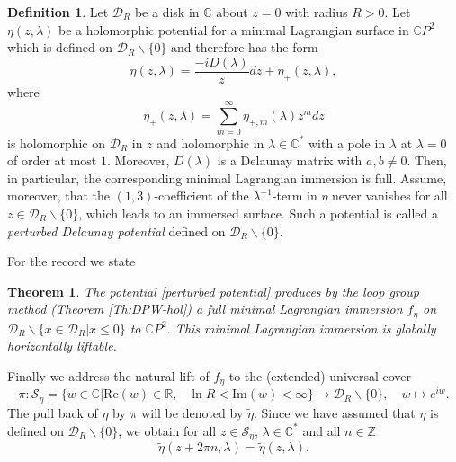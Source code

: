 \documentclass[a4paper,11pt]{amsart}
\newtheorem{theorem}{Theorem}[section]
\theoremstyle{definition}
\newtheorem{definition}{Definition}
\numberwithin{equation}{section}
\newcommand{\C}{\mathbb{C}}
\begin{document}
\begin{definition}
Let $\mathcal{D}_R$ be  a disk in $\mathbb{C}$ about $z=0$ with radius $R>0$.
Let $\eta(z,\lambda)$ be a holomorphic potential for a minimal Lagrangian surface 
in $\C P^2$ which is defined on $\mathcal{D}_R\backslash \{0\}$ and therefore has the form
\begin{equation}\label{perturbed potential}
\eta(z,\lambda) = \frac{-iD(\lambda)}{z} dz + \eta_+(z,\lambda), 
\end{equation}
where
 \begin{equation*}
\eta_+ (z, \lambda) =\sum_{m=0}^\infty \eta_{+,m}(\lambda) z^m dz
\end{equation*}
is holomorphic on $\mathcal{D}_R$ in $z$ and holomorphic in $\lambda\in \mathbb{C}^*$ with a pole in $\lambda$ at $\lambda = 0$ of order at most $1$. Moreover, 
 $D(\lambda)$ is a Delaunay matrix with $a,b\neq 0$. Then, in particular, the corresponding 
minimal Lagrangian immersion is full.
Assume, moreover, that  the $(1,3)$-coefficient of the $\lambda^{-1}$-term in 
$\eta$ never vanishes for all $z\in \mathcal{D}_R\backslash\{0\}$, which leads to an immersed surface. Such a potential is called a \emph{perturbed Delaunay potential} defined on $\mathcal{D}_R \backslash \{0\}$.
\end{definition}

For the record we state 
\begin{theorem}
The potential \eqref{perturbed potential} produces by the loop group method (Theorem \ref{Th:DPW-hol}) a full minimal Lagrangian immersion $f_{\eta}$ on $\mathcal{D}_R \backslash \{ x\in \mathcal{D}_R | x\leq 0\}$ to $\mathbb{C}P^2$. This minimal Lagrangian immersion is globally horizontally liftable.
\end{theorem}

Finally we address the natural lift of $f_{\eta}$ to the (extended) universal cover
\begin{equation}
\pi: \mathcal{S}_{\eta}=\{w\in\mathbb{C}| \mathrm{Re}( w) \in \mathbb{R}, -\ln R < \mathrm{Im}(w) <\infty\}\rightarrow \mathcal{D}_R\backslash\{0\},\quad w\mapsto e^{iw}.
\end{equation}
The pull back of $\eta$ by $\pi$ will be denoted by $\tilde{\eta}$.
Since we have assumed that $\eta$ is defined on $\mathcal{D}_R\backslash\{0\}$, we obtain for all 
$z\in \mathcal{S}_{\eta}$, $\lambda\in\mathbb{C}^*$ and all  $n \in \mathbb{Z}$ 
\begin{equation}
\tilde{\eta}(z+2\pi n,\lambda)=\tilde{\eta}(z,\lambda).
\end{equation}
\end{document}
